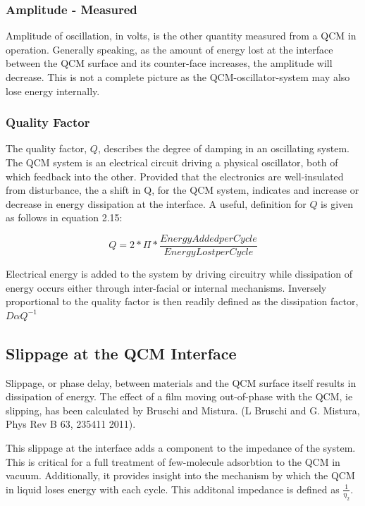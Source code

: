 \subsubsection{Amplitude - Measured}

Amplitude of oscillation, in volts, is the other quantity measured from a QCM in operation.  Generally speaking, as the amount of energy lost at the interface between the QCM surface and its counter-face increases, the amplitude will decrease. This is not a complete picture as the QCM-oscillator-system may also lose energy internally.


\subsubsection{Quality Factor}

The quality factor, $Q$, describes the degree of damping in an oscillating system. The QCM system is an electrical circuit driving a physical oscillator, both of which feedback into the other. Provided that the electronics are well-insulated from disturbance, the a shift in Q, for the QCM system, indicates and increase or decrease in energy dissipation at the interface. A useful,  definition for $Q$ is given as follows in equation 2.15:

\begin{equation}
Q = 2* \Pi* \frac{Energy Added per Cycle}{Energy Lost per Cycle}
\end{equation}

Electrical energy is added to the system by driving circuitry while dissipation of energy occurs either through inter-facial or internal mechanisms. Inversely proportional to the quality factor is then readily defined as the dissipation factor, $D \alpha Q^{-1}$

\subsection{Slippage at the QCM Interface}

Slippage, or phase delay, between materials and the QCM surface itself results in dissipation of energy. The effect of a film moving out-of-phase with the QCM, ie slipping, has been calculated by Bruschi and Mistura. (L Bruschi and G. Mistura, Phys Rev B 63, 235411 2011).

This slippage at the interface adds a component to the impedance of the system. This is critical for a full treatment of few-molecule adsorbtion to the QCM in vacuum. Additionally, it provides insight into the mechanism by which the QCM in liquid loses energy with each cycle. This additonal impedance is defined as $\frac{1}{\eta_{2}}$.

